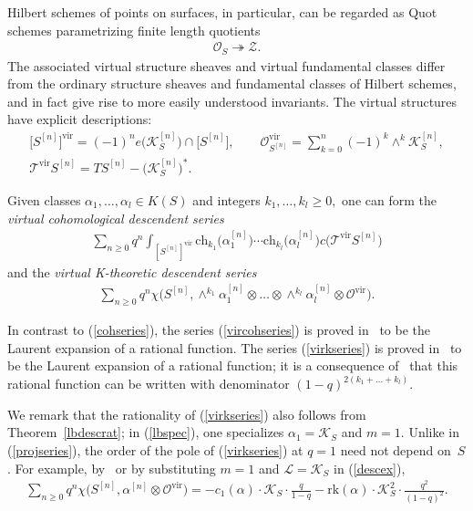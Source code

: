 \documentclass[pdftex]{sigma}
\numberwithin{equation}{section}
\def\O{\mathcal{O}}
\newcommand{\vir}{\mathrm{vir}}
\newcommand{\ch}{\mathrm{ch}}
\begin{document}
Hilbert schemes of points on surfaces, in particular, can be regarded as Quot schemes parametrizing finite length quotients
\begin{gather*}
\O_{S}\twoheadrightarrow \mathcal{Z}.
\end{gather*}
The associated virtual structure sheaves and virtual fundamental classes differ from the ordinary structure sheaves and fundamental classes of Hilbert schemes, and in fact give rise to more easily understood invariants. The virtual structures have explicit descriptions:
\begin{gather*}
\big[S^{[n]}\big]^{\vir}=(-1)^{n} e\big(\mathcal{K}_S^{[n]}\big)\cap \big[S^{[n]}\big],\qquad
\O^{\vir}_{S^{[n]}}=\sum_{k=0}^{n} (-1)^{k} \wedge^{k} \mathcal{K}_S^{[n]},\\ \mathcal{T}^{\vir}S^{[n]}=TS^{[n]}-\big(\mathcal{K}_S^{[n]}\big)^{*}.
\end{gather*}

Given classes $\alpha_1,\dots,\alpha_l\in K(S)$ and integers $k_1,\dots,k_l\geq 0,$ one can form the {\em virtual cohomological descendent series}
\begin{align}\label{vircohseries}
\sum_{n\geq 0} q^n\int_{[S^{[n]}]^{\vir}} \ch_{k_1}\big(\alpha_1^{[n]}\big)\cdots \ch_{k_l}\big(\alpha_l^{[n]}\big) c\big(\mathcal{T}^{\vir}S^{[n]}\big)
\end{align}
and the {\em virtual K-theoretic descendent series}
\begin{align}\label{virkseries}
\sum_{n \geq 0} q^n \chi\big(S^{[n]}, \wedge^{k_1} \alpha^{[n]}_1\otimes \dots\otimes \wedge^{k_l} \alpha^{[n]}_l\otimes \mathcal{O}^{\vir}\big).
\end{align}

In contrast to (\ref{cohseries}), the series (\ref{vircohseries}) is proved in~\cite[Theorem~2]{JOP} to be the Laurent expansion of a rational function. The series (\ref{virkseries}) is proved in~\cite[Theorem~1]{AJLOP} to be the Laurent expansion of a rational function; it is a consequence of~\cite[Theorem~4]{AJLOP} that this rational function can be written with denominator $(1-q)^{2(k_1+\dots+k_l)}$.

We remark that the rationality of (\ref{virkseries}) also follows from Theorem~\ref{lbdescrat}; in (\ref{lbspec}), one specializes $\alpha_1=\mathcal{K}_S$ and $m=1$. Unlike in (\ref{projseries}), the order of the pole of (\ref{virkseries}) at $q=1$ need not depend on~$S$. For example, by~\cite[Example 7]{AJLOP} or by substituting $m=1$ and $\mathcal{L}=\mathcal{K}_S$ in (\ref{descex}),
\begin{gather*}
\sum_{n\geq 0} q^n \chi\big(S^{[n]},\alpha^{[n]}\otimes \mathcal{O}^{\vir}\big)=-c_1(\alpha) \cdot \mathcal{K}_S\cdot \frac{q}{1-q}-\mathrm{rk}(\alpha)\cdot \mathcal{K}_S^2\cdot \frac{q^2}{(1-q)^2}.
\end{gather*}
\end{document}
